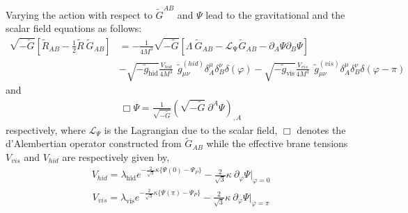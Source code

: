 \documentclass{article}
\begin{document}
Varying the action with respect to $\tilde{G}^{AB}$ and $\Psi$ lead to the gravitational and the scalar field 
equations as follows:
\begin{align}
 \sqrt{-\tilde{G}}\left[\tilde{R}_{AB} - \frac{1}{2}\tilde{R}~\tilde{G}_{AB}\right]&=-\frac{1}{4M^3}\sqrt{-\tilde{G}}\left[\Lambda~ \tilde{G}_{AB} - \mathcal{L}_\mathrm{\Psi}\tilde{G}_{AB} 
 - \partial_{A}\Psi\partial_{B}\Psi\right] \nonumber \\
& - \sqrt{-\tilde{g}_\mathrm{hid}}\frac{V_{hid}}{4M^3}~~\tilde{g}_{\mu\nu}^{(hid)}\delta^{\mu}_{A}\delta^{\nu}_{B}
 \delta(\varphi) - \sqrt{-\tilde{g}_\mathrm{vis}}\frac{V_{vis}}{4M^3}~~\tilde{g}_{\mu\nu}^{(vis)}\delta^{\mu}_{A}\delta^{\nu}_{B}
 \delta(\varphi - \pi)
 \label{gravitational equation}
\end{align}
and
\begin{eqnarray}
 \Box{\Psi} = \frac{1}{\sqrt{-\tilde{G}}}\left(\sqrt{-\tilde{G}}~\partial^{A}\Psi\right)_{,A}
 \label{scalar field equation}
\end{eqnarray}
respectively, where $\mathcal{L}_\Psi$ is the Lagrangian due to the scalar field, $\Box$ denotes the d'Alembertian operator constructed from $\tilde{G}_{AB}$ while the effective brane tensions $V_{vis}$ and $V_{hid}$ are respectively given by,
\begin{align}
V_{hid} = \lambda_\mathrm{hid}e^{-\frac{2}{\sqrt{3}}\kappa\lbrace \Psi(0)-\Psi_P\rbrace} -\frac{2}{\sqrt{3}}\kappa ~ \partial_\varphi\Psi|_{\varphi=0}
\label{Vhid}
\end{align}
\begin{align}
V_{vis} = \lambda_\mathrm{vis}e^{-\frac{2}{\sqrt{3}}\kappa \lbrace\Psi(\pi)-\Psi_P\rbrace} -\frac{2}{\sqrt{3}}\kappa ~ \partial_\varphi\Psi|_{\varphi=\pi}
\label{Vvis}
 \end{align}
\end{document}
